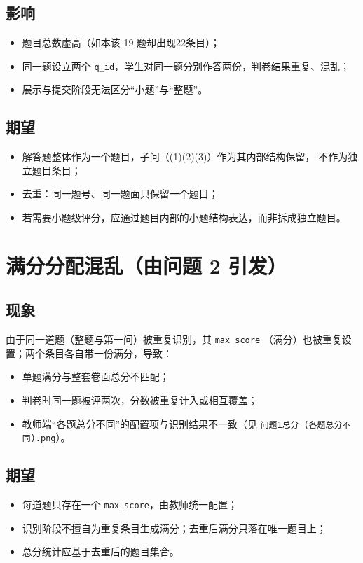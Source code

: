 \documentclass[12pt,a4paper]{ctexart}
\begin{document}
\subsection{影响}
\begin{itemize}[leftmargin=2em]
  \item 题目总数虚高（如本该 19 题却出现22条目）；
  \item 同一题设立两个 \texttt{q\_id}，学生对同一题分别作答两份，判卷结果重复、混乱；
  \item 展示与提交阶段无法区分“小题”与“整题”。
\end{itemize}

\subsection{期望}
\begin{itemize}[leftmargin=2em]
  \item 解答题整体作为一个题目，子问（(1)(2)(3)）作为其内部结构保留，
        不作为独立题目条目；
  \item 去重：同一题号、同一题面只保留一个题目；
  \item 若需要小题级评分，应通过题目内部的小题结构表达，而非拆成独立题目。
\end{itemize}

\section{满分分配混乱（由问题 2 引发）}

\subsection{现象}
由于同一道题（整题与第一问）被重复识别，其 \texttt{max\_score}
（满分）也被重复设置；两个条目各自带一份满分，导致：
\begin{itemize}[leftmargin=2em]
  \item 单题满分与整套卷面总分不匹配；
  \item 判卷时同一题被评两次，分数被重复计入或相互覆盖；
  \item 教师端“各题总分不同”的配置项与识别结果不一致（见
        \texttt{问题1总分 (各题总分不同).png}）。
\end{itemize}

\subsection{期望}
\begin{itemize}[leftmargin=2em]
  \item 每道题只存在一个 \texttt{max\_score}，由教师统一配置；
  \item 识别阶段不擅自为重复条目生成满分；去重后满分只落在唯一题目上；
  \item 总分统计应基于去重后的题目集合。
\end{itemize}
\end{document}
